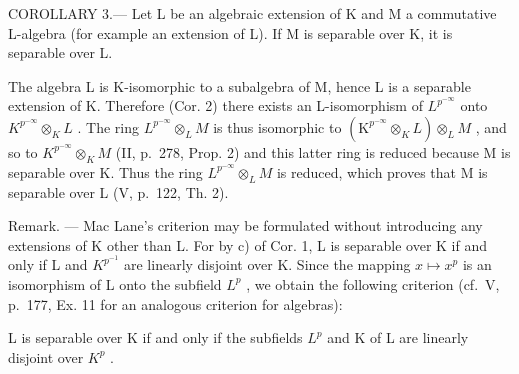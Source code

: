 COROLLARY 3.--- Let L be an algebraic extension of K and M a commutative L-algebra (for example an extension of L). If M is separable over K, it is separable over L.

The algebra L is K-isomorphic to a subalgebra of M, hence L is a separable extension of K. Therefore (Cor. 2) there exists an L-isomorphism of \(L^{p^{-\infty}}\) onto \(K^{p^{-\infty}} \otimes_{K} L\) . The ring \(L^{p^{-\infty}} \otimes_{L} M\) is thus isomorphic to \((\mathrm{K}^{p^{-\infty}} \otimes_{K} L) \otimes_{L} M\) , and so to \(K^{p^{-\infty}} \otimes_{K} M\) (II, p.~278, Prop. 2) and this latter ring is reduced because M is separable over K. Thus the ring \(L^{p^{-\infty}} \otimes_{L} M\) is reduced, which proves that M is separable over L (V, p.~122, Th. 2).

Remark. --- Mac Lane's criterion may be formulated without introducing any extensions of K other than L. For by c) of Cor. 1, L is separable over K if and only if L and \(K^{p^{-1}}\) are linearly disjoint over K. Since the mapping \(x \mapsto x^{p}\) is an isomorphism of L onto the subfield \(L^{p}\) , we obtain the following criterion (cf.~V, p.~177, Ex. 11 for an analogous criterion for algebras):

L is separable over K if and only if the subfields \(L^{p}\) and K of L are linearly disjoint over \(K^{p}\) .

